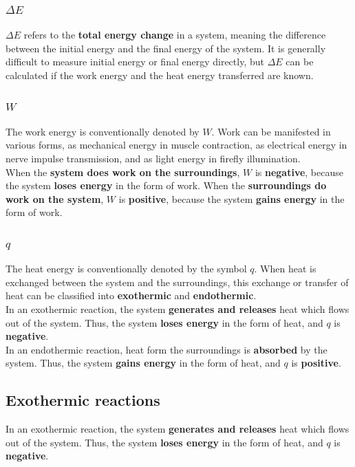 \documentclass[11pt]{article}
\begin{document}
\subsubsection{\(\Delta E\)}
\label{sec:org73da180}
\(\Delta E\) refers to the \textbf{total energy change} in a system, meaning the difference between the initial energy and the final energy of the system. It is generally difficult to measure initial energy or final energy directly, but \(\Delta E\) can be calculated if the work energy and the heat energy transferred are known.

\subsubsection{\(W\)}
\label{sec:org90058d7}
The work energy is conventionally denoted by \(W\). Work can be manifested in various forms, as mechanical energy in muscle contraction, as electrical energy in nerve impulse transmission, and as light energy in firefly illumination.
\\[0pt]

When the \textbf{system does work on the surroundings}, \(W\) is \textbf{negative}, because the system \textbf{loses energy} in the form of work. When the \textbf{surroundings do work on the system}, \(W\) is \textbf{positive}, because the system \textbf{gains energy} in the form of work.

\subsubsection{\(q\)}
\label{sec:org4753e69}
The heat energy is conventionally denoted by the symbol \(q\). When heat is exchanged between the system and the surroundings, this exchange or transfer of heat can be classified into \textbf{exothermic} and \textbf{endothermic}.
\\[0pt]

In an exothermic reaction, the system \textbf{generates and releases} heat which flows out of the system. Thus, the system \textbf{loses energy} in the form of heat, and \(q\) is \textbf{negative}.
\\[0pt]

In an endothermic reaction, heat form the surroundings is \textbf{absorbed} by the system. Thus, the system \textbf{gains energy} in the form of heat, and \(q\) is \textbf{positive}.

\subsection{Exothermic reactions}
\label{sec:org06f6538}
In an exothermic reaction, the system \textbf{generates and releases} heat which flows out of the system. Thus, the system \textbf{loses energy} in the form of heat, and \(q\) is \textbf{negative}.
\end{document}
